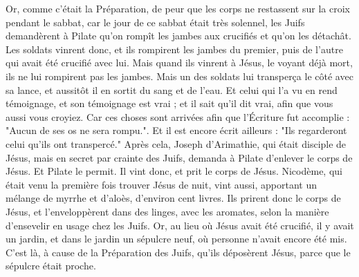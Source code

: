 Or, comme c’était la Préparation, de peur que les corps ne restassent sur la croix pendant le sabbat, car le jour de ce sabbat était très solennel, les Juifs demandèrent à Pilate qu’on rompît les jambes aux crucifiés et qu’on les détachât. Les soldats vinrent donc, et ils rompirent les jambes du premier, puis de l’autre qui avait été crucifié avec lui. Mais quand ils vinrent à Jésus, le voyant déjà mort, ils ne lui rompirent pas les jambes. Mais un des soldats lui transperça le côté avec sa lance, et aussitôt il en sortit du sang et de l’eau. Et celui qui l’a vu en rend témoignage, et son témoignage est vrai ; et il sait qu’il dit vrai, afin que vous aussi vous croyiez. Car ces choses sont arrivées afin que l’Écriture fut accomplie : "Aucun de ses os ne sera rompu.". Et il est encore écrit ailleurs : "Ils regarderont celui qu’ils ont transpercé." Après cela, Joseph d’Arimathie, qui était disciple de Jésus, mais en secret par crainte des Juifs, demanda à Pilate d’enlever le corps de Jésus. Et Pilate le permit. Il vint donc, et prit le corps de Jésus. Nicodème, qui était venu la première fois trouver Jésus de nuit, vint aussi, apportant un mélange de myrrhe et d’aloès, d’environ cent livres. Ils prirent donc le corps de Jésus, et l’enveloppèrent dans des linges, avec les aromates, selon la manière d’ensevelir en usage chez les Juifs. Or, au lieu où Jésus avait été crucifié, il y avait un jardin, et dans le jardin un sépulcre neuf, où personne n’avait encore été mis. C’est là, à cause de la Préparation des Juifs, qu’ils déposèrent Jésus, parce que le sépulcre était proche.